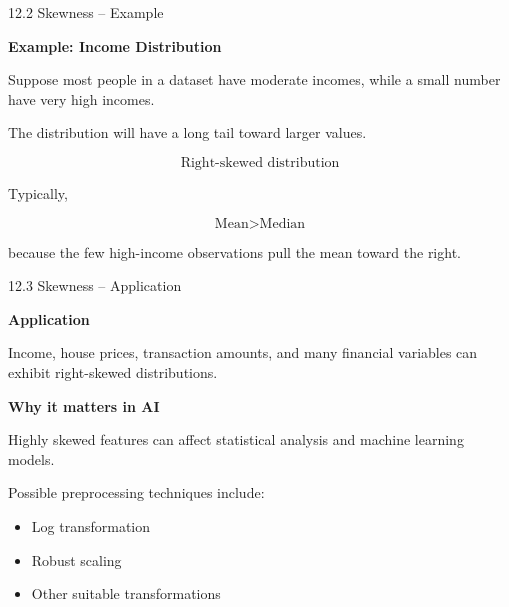 
\begin{frame}{12.2 Skewness -- Example}

\textbf{Example: Income Distribution}

Suppose most people in a dataset have moderate incomes,
while a small number have very high incomes.

\vspace{0.1cm}

The distribution will have a long tail toward larger values.

\[
\boxed{\text{Right-skewed distribution}}
\]

\vspace{0.1cm}

Typically,

\[
\text{Mean}>\text{Median}
\]

because the few high-income observations pull the mean
toward the right.

\end{frame}


\begin{frame}{12.3 Skewness -- Application}

\textbf{Application}

Income, house prices, transaction amounts, and many financial
variables can exhibit right-skewed distributions.

\vspace{0.3cm}

\textbf{Why it matters in AI}

Highly skewed features can affect statistical analysis and
machine learning models.

\vspace{0.3cm}

Possible preprocessing techniques include:

\begin{itemize}
    \item Log transformation
    \item Robust scaling
    \item Other suitable transformations
\end{itemize}

\end{frame}

